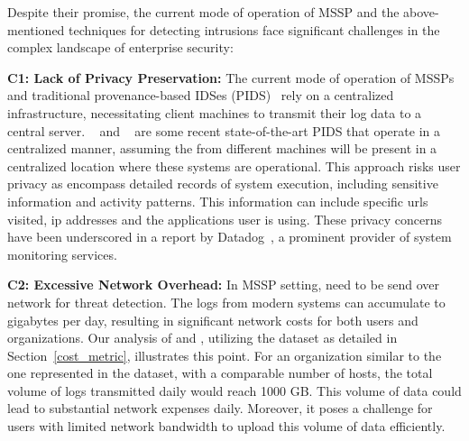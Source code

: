 Despite their promise, the current mode of operation of MSSP and the above-mentioned techniques for detecting intrusions face significant challenges in the complex landscape of enterprise security:

\smallskip
\noindent
\textbf{C1: Lack of Privacy Preservation:} The current mode of operation of MSSPs and traditional provenance-based IDSes (PIDS)~\cite{flash2024,cheng2023kairos,wang2022threatrace} rely on a centralized infrastructure, necessitating client machines to transmit their log data to a central server. \flash~\cite{flash2024} and \kairos~\cite{cheng2023kairos} are some recent state-of-the-art PIDS that operate in a centralized manner, assuming the \logs from different machines will be present in a centralized location where these systems are operational. This approach risks user privacy as \logs encompass detailed records of system execution, including sensitive information and activity patterns. This information can include specific urls visited, ip addresses and the applications user is using. These privacy concerns have been underscored in a report by Datadog~\cite{datadog}, a prominent provider of system monitoring services.
    
\smallskip
\noindent
\textbf{C2: Excessive Network Overhead:} In MSSP setting, \logs need to be send over network for threat detection. The logs from modern systems can accumulate to gigabytes per day, resulting in significant network costs for both users and organizations. Our analysis of \flash and \kairos, utilizing the \optc dataset as detailed in Section~\ref{cost_metric}, illustrates this point. For an organization similar to the one represented in the \optc dataset, with a comparable number of hosts, the total volume of logs transmitted daily would reach 1000 GB. This volume of data could lead to substantial network expenses daily. Moreover, it poses a challenge for users with limited network bandwidth to upload this volume of data efficiently.
    

